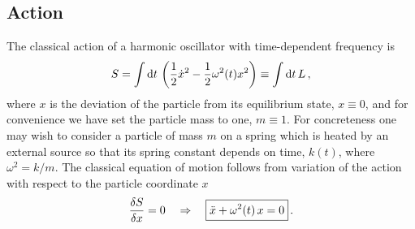 \documentclass[12pt,letterpaper,rotate]{article}
\def\d{{\rm d}}
\begin{document}
{\subsection{Action} 

The classical action of a harmonic oscillator with time-dependent frequency is
\begin{equation}
S = \int \d t \, \left(\frac{1}{2} \dot{x}^2 -\frac{1}{2} \omega^2(t) x^2 \right) \equiv \int \d t \, L\, ,
\end{equation}
where $x$ is the deviation of the particle from its equilibrium state, $x \equiv 0$, and for convenience we have set the particle mass to one, $m \equiv 1$. For concreteness one may wish to consider a particle of mass $m$ on a spring which is heated by an external source so that its spring constant depends on time, $k(t)$, where $\omega^2 =k/m$. The classical equation of motion follows from variation of the action with respect to the particle coordinate $x$
\begin{equation}
\frac{\delta S}{\delta x} = 0 \quad \Rightarrow \quad \fbox{$\displaystyle \ddot{x} + \omega^2(t)\, x =0 $}\, .
\end{equation}

}
\end{document}
